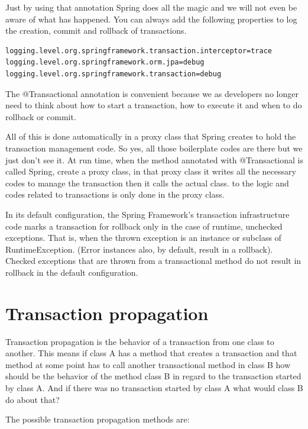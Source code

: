Just by using that annotation Spring does all the magic and we will not even be aware of what has happened.
You can always add the following properties to log the creation, commit and rollback of transactions.

\begin{verbatim}
logging.level.org.springframework.transaction.interceptor=trace
logging.level.org.springframework.orm.jpa=debug
logging.level.org.springframework.transaction=debug
\end{verbatim}

The @Transactional annotation is convenient because we as developers no longer need to think about how to start a transaction, how to execute it and when to do rollback or commit.

All of this is done automatically in a proxy class that Spring creates to hold the transaction management code. So yes, all those boilerplate codes are there but we just don’t see it. At run time, when the method annotated with @Transactional is called Spring, create a proxy class, in that proxy class it writes all the necessary codes to manage the transaction then it calls the actual class. to the logic and codes related to transactions is only done in the proxy class.

In its default configuration, the Spring Framework’s transaction infrastructure code marks a transaction for rollback only in the case of runtime, unchecked exceptions. That is, when the thrown exception is an instance or subclass of RuntimeException. (Error instances also, by default, result in a rollback). Checked exceptions that are thrown from a transactional method do not result in rollback in the default configuration.

\section{Transaction propagation}


Transaction propagation is the behavior of a transaction from one class to another. This means if class A has a method that creates a transaction and that method at some point has to call another transactional method in class B how should be the behavior of the method class B in regard to the transaction started by class A. And if there was no transaction started by class A what would class B do about that?

The possible transaction propagation methods are:

